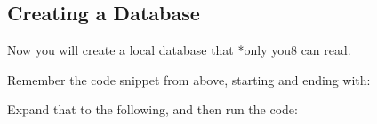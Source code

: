 \hypertarget{creating-a-database}{\subsection{Creating a
Database}\label{creating-a-database}}

Now you will create a local database that *only you8 can read.

Remember the code snippet from above, starting and ending with:

\begin{Shaded}
\begin{Highlighting}[]


\NormalTok{(}\OperatorTok{,} \NormalTok{ () }\OperatorTok{=>} \OperatorTok{\{}
\OperatorTok{=}  
  \NormalTok{(}\NormalTok{)}
\OperatorTok{\}}\NormalTok{)}
\end{Highlighting}
\end{Shaded}

Expand that to the following, and then run the code:

\begin{Shaded}
\begin{Highlighting}[]
\OperatorTok{,}


\NormalTok{(}\OperatorTok{,} \NormalTok{ () }\OperatorTok{=>} \OperatorTok{\{}
\OperatorTok{=}

  \OperatorTok{=} \OperatorTok{\{}
    \OperatorTok{:} \OperatorTok{\{} \OperatorTok{:}\NormalTok{ [}\NormalTok{] }\OperatorTok{\}}
    \OperatorTok{:} 
  \OperatorTok{\}}
  
\OperatorTok{=}\NormalTok{(}\OperatorTok{,}
\NormalTok{()}
  
\OperatorTok{=} \NormalTok{(}\NormalTok{)}
  \NormalTok{(}\NormalTok{)}
\OperatorTok{\}}\NormalTok{)}
\end{Highlighting}
\end{Shaded}

